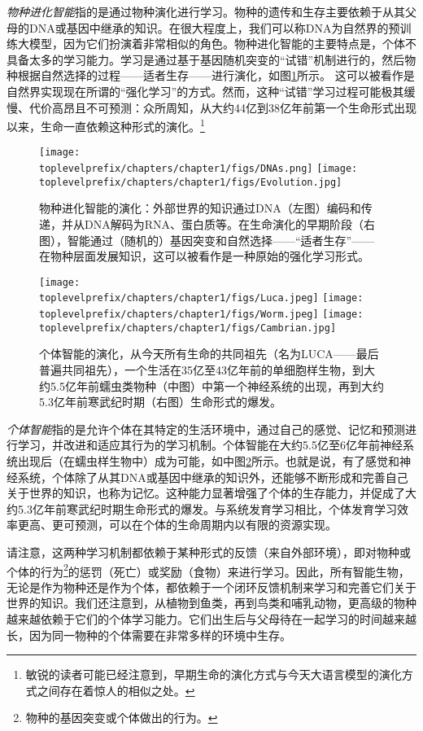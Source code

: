 \documentclass[../../book-main_zh.tex]{subfiles}
\begin{document}
{\em 物种进化智能}指的是通过物种演化进行学习。物种的遗传和生存主要依赖于从其父母的DNA或基因中继承的知识。在很大程度上，我们可以称DNA为自然界的预训练大模型，因为它们扮演着非常相似的角色。物种进化智能的主要特点是，个体不具备太多的学习能力。学习是通过基于基因随机突变的“试错”机制进行的，然后物种根据自然选择的过程——适者生存——进行演化，如图\ref{fig:phylogenetic}所示。
这可以被看作是自然界实现现在所谓的“强化学习”的方式。然而，这种“试错”学习过程可能极其缓慢、代价高昂且不可预测：众所周知，从大约44亿到38亿年前第一个生命形式出现以来，生命一直依赖这种形式的演化。\footnote{敏锐的读者可能已经注意到，早期生命的演化方式与今天大语言模型的演化方式之间存在着惊人的相似之处。} 
\begin{figure}
    \centering
\texttt{[image: \\toplevelprefix/chapters/chapter1/figs/DNAs.png]}
\texttt{[image: \\toplevelprefix/chapters/chapter1/figs/Evolution.jpg]}
    \caption{物种进化智能的演化：外部世界的知识通过DNA（左图）编码和传递，并从DNA解码为RNA、蛋白质等。在生命演化的早期阶段（右图），智能通过（随机的）基因突变和自然选择——“适者生存”——在物种层面发展知识，这可以被看作是一种原始的强化学习形式。}
    \label{fig:phylogenetic}
\end{figure}
\begin{figure}
    \centering
\texttt{[image: \\toplevelprefix/chapters/chapter1/figs/Luca.jpeg]}
\texttt{[image: \\toplevelprefix/chapters/chapter1/figs/Worm.jpeg]}
\texttt{[image: \\toplevelprefix/chapters/chapter1/figs/Cambrian.jpg]}
    \caption{个体智能的演化，从今天所有生命的共同祖先（名为LUCA——最后普遍共同祖先），一个生活在35亿至43亿年前的单细胞样生物，到大约5.5亿年前蠕虫类物种（中图）中第一个神经系统的出现，再到大约5.3亿年前寒武纪时期（右图）生命形式的爆发。}
    \label{fig:evolution}
\end{figure}

{\em 个体智能}指的是允许个体在其特定的生活环境中，通过自己的感觉、记忆和预测进行学习，并改进和适应其行为的学习机制。个体智能在大约5.5亿至6亿年前神经系统出现后（在蠕虫样生物中）成为可能，如中图\ref{fig:evolution}所示。也就是说，有了感觉和神经系统，个体除了从其DNA或基因中继承的知识外，还能够不断形成和完善自己关于世界的知识，也称为记忆。这种能力显著增强了个体的生存能力，并促成了大约5.3亿年前寒武纪时期生命形式的爆发。与系统发育学习相比，个体发育学习效率更高、更可预测，可以在个体的生命周期内以有限的资源实现。

请注意，这两种学习机制都依赖于某种形式的反馈（来自外部环境），即对物种或个体的行为\footnote{物种的基因突变或个体做出的行为。}的惩罚（死亡）或奖励（食物）来进行学习。因此，所有智能生物，无论是作为物种还是作为个体，都依赖于一个闭环反馈机制来学习和完善它们关于世界的知识。我们还注意到，从植物到鱼类，再到鸟类和哺乳动物，更高级的物种越来越依赖于它们的个体学习能力。它们出生后与父母待在一起学习的时间越来越长，因为同一物种的个体需要在非常多样的环境中生存。
\end{document}
